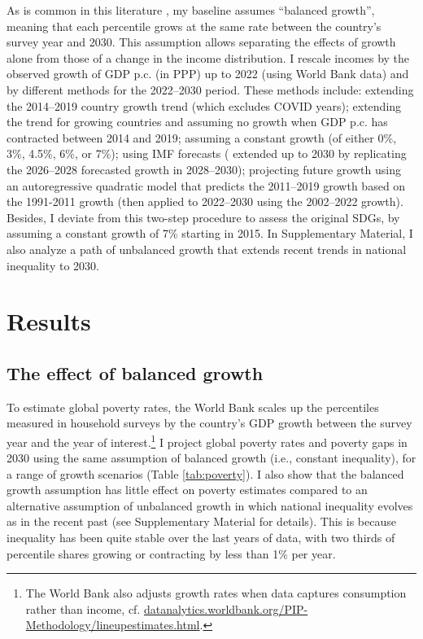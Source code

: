 As is common in this literature \citep{karver_mdgs_2012,hellebrandt_future_2015,bicaba_can_2017}, my baseline assumes ``balanced growth'', meaning that each percentile grows at the same rate between the country's survey year and 2030. This assumption allows separating the effects of growth alone from those of a change in the income distribution. 
I rescale incomes by the observed growth of GDP p.c. (in PPP) up to 2022 (using World Bank data) and by different methods for the 2022--2030 period. 
These methods include: extending the 2014--2019 country growth trend (which excludes COVID years); extending the trend for growing countries and assuming no growth when GDP p.c. has contracted between 2014 and 2019; assuming a constant growth (of either 0\%, 3\%, 4.5\%, 6\%, or 7\%); using IMF forecasts (\cite{imf_world_2023} extended up to 2030 by replicating the 2026--2028 forecasted growth in 2028--2030); projecting future growth using an autoregressive quadratic model that predicts the 2011--2019 growth based on the 1991-2011 growth (then applied to 2022--2030 using the 2002--2022 growth). Besides, I deviate from this two-step procedure to assess the original SDGs, 
by assuming a constant growth of 7\% starting in 2015. In Supplementary Material, I also analyze a path of unbalanced growth that extends recent trends in national inequality to 2030.  

\section{Results}
\subsection{The effect of balanced growth}

To estimate global poverty rates, the World Bank scales up the percentiles measured in household surveys by the country's GDP growth between the survey year and the year of interest.\footnote{The World Bank also adjusts growth rates when data captures consumption rather than income, cf. \href{https://datanalytics.worldbank.org/PIP-Methodology/lineupestimates.html\#extrapolations}{datanalytics.worldbank.org/PIP-Methodology/lineupestimates.html}.} I project global poverty rates and poverty gaps in 2030 using the same assumption of balanced growth (i.e., constant inequality), for a range of growth scenarios (Table \ref{tab:poverty}). I also show that the balanced growth assumption has little effect on poverty estimates compared to an alternative assumption of unbalanced growth in which national inequality evolves as in the recent past (see Supplementary Material for details). This is because inequality has been quite stable over the last years of data, with two thirds of percentile shares growing or contracting by less than 1\% per year.


